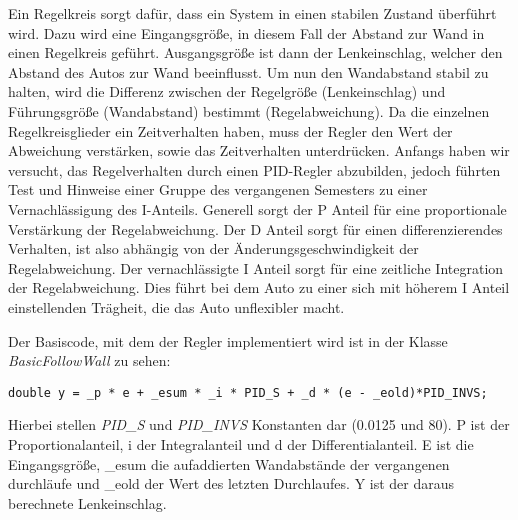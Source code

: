 Ein Regelkreis sorgt dafür, dass ein System in einen stabilen Zustand überführt wird. Dazu wird eine Eingangsgröße, in diesem Fall der Abstand zur Wand in einen Regelkreis geführt. Ausgangsgröße ist dann der Lenkeinschlag, welcher den Abstand des Autos zur Wand beeinflusst. Um nun den Wandabstand stabil zu halten, wird die Differenz zwischen der Regelgröße (Lenkeinschlag) und Führungsgröße (Wandabstand) bestimmt (Regelabweichung). Da die einzelnen Regelkreisglieder ein Zeitverhalten haben, muss der Regler den Wert der Abweichung verstärken, sowie das Zeitverhalten unterdrücken. 
Anfangs haben wir versucht, das Regelverhalten durch einen PID-Regler abzubilden, jedoch führten Test und Hinweise einer Gruppe des vergangenen Semesters zu einer Vernachlässigung des I-Anteils. Generell sorgt der P Anteil für eine proportionale Verstärkung der Regelabweichung. Der D Anteil sorgt für einen differenzierendes Verhalten, ist also abhängig von der Änderungsgeschwindigkeit der Regelabweichung.
Der vernachlässigte I Anteil sorgt für eine zeitliche Integration der Regelabweichung. Dies führt bei dem Auto zu einer sich mit höherem I Anteil einstellenden Trägheit, die das Auto unflexibler macht.

Der Basiscode, mit dem der Regler implementiert wird ist in der Klasse \textit{BasicFollowWall} zu sehen:
\begin{lstlisting}
double y = _p * e + _esum * _i * PID_S + _d * (e - _eold)*PID_INVS;
\end{lstlisting}
Hierbei stellen \textit{PID_S} und \textit{PID_INVS} Konstanten dar (0.0125 und 80). P ist der Proportionalanteil, i der Integralanteil und d der Differentialanteil. E ist die Eingangsgröße, _esum die aufaddierten Wandabstände der vergangenen durchläufe und _eold der Wert des letzten Durchlaufes. Y ist der daraus berechnete Lenkeinschlag.

